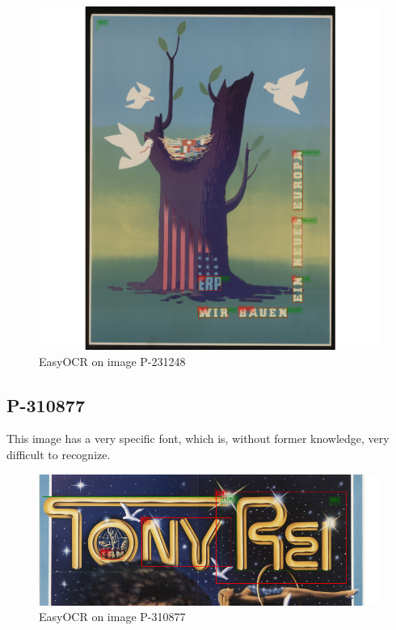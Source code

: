 \begin{figure}[hbtp!]
    \centering
    \includegraphics[width=\textwidth]{obrazky/plakaty/result_easyOCR_vienna1_split_tuning_special_sensitive-60verticaltextproblem.png}
    \caption{EasyOCR on image P-231248}
    \label{Im7:ex:easy}
\end{figure}


\subsection*{P-310877}
This image has a very specific font, which is, without former knowledge, very difficult to recognize.

\begin{figure}[hbtp!]
    \centering
    \includegraphics[width=\textwidth]{obrazky/plakaty/result_easyOCR_vienna2_nosplit_notuning_nocorrection-70.png}
    \caption{EasyOCR on image P-310877}
    \label{Im6:ex:easy}
\end{figure}




